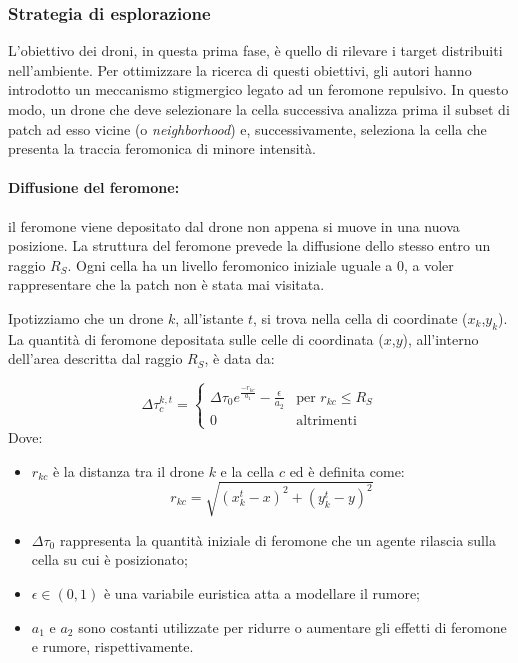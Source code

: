 \subsubsection{Strategia di esplorazione}

L'obiettivo dei droni, in questa prima fase, è quello di rilevare i target distribuiti nell'ambiente.
Per ottimizzare la ricerca di questi obiettivi, gli autori hanno introdotto un meccanismo stigmergico legato ad un feromone repulsivo.
In questo modo, un drone che deve selezionare la cella successiva analizza prima il subset di patch ad esso vicine (o \textit{neighborhood}) e, successivamente, seleziona la cella che presenta la traccia feromonica di minore intensità.

\paragraph{Diffusione del feromone:} il feromone viene depositato dal drone non appena si muove in una nuova posizione.
La struttura del feromone prevede la diffusione dello stesso entro un raggio $R_S$.
Ogni cella ha un livello feromonico iniziale uguale a 0, a voler rappresentare che la patch non è stata mai visitata.

Ipotizziamo che un drone $k$, all'istante $t$, si trova nella cella di coordinate ($x_k$,$y_k$).
La quantità di feromone depositata sulle celle di coordinata ($x$,$y$), all'interno dell'area descritta dal raggio $R_S$, è data da:

\begin{equation}
    \Delta\tau_{c}^{k,t} = 
    \begin{cases}
        \Delta\tau_{0}e^{\frac{-r_{kc}}{a_1}} - \frac{\epsilon}{a_2} &\text{per $r_{kc} \leq R_S$}\\
        0 &\text{altrimenti}
    \end{cases}
\end{equation}
Dove:
\begin{itemize}
    \item $r_{kc}$ è la distanza tra il drone $k$ e la cella $c$ ed è definita come:
    \begin{equation}
        r_{kc} = \sqrt{(x^{t}_{k} - x)^{2} + (y^{t}_{k} - y)^{2}}
    \end{equation}
    \item $\Delta\tau_{0}$ rappresenta la quantità iniziale di feromone che un agente rilascia sulla cella su cui è posizionato;
    \item $\epsilon \in (0,1)$ è una variabile euristica atta a modellare il rumore;
    \item $a_{1}$ e $a_{2}$ sono costanti utilizzate per ridurre o aumentare gli effetti di feromone e rumore, rispettivamente. 
\end{itemize} 

